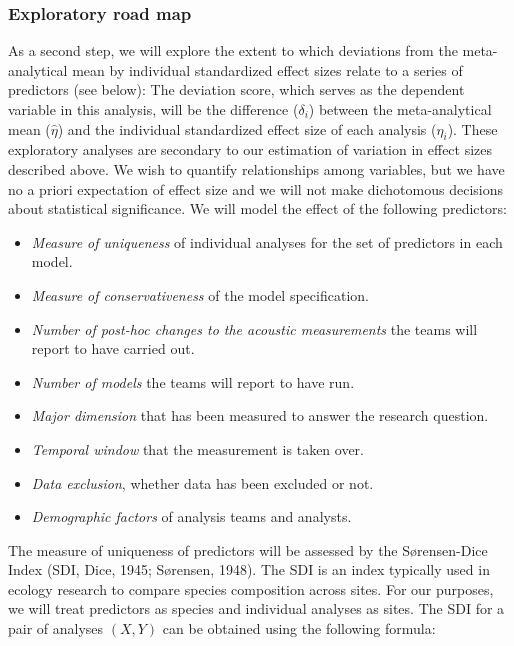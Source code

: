 \documentclass[
  english,
  man]{apa6}
\providecommand{\tightlist}{%
  \setlength{\itemsep}{0pt}\setlength{\parskip}{0pt}}
\begin{document}
\hypertarget{exploratory-road-map}{%
\subsubsection{Exploratory road map}\label{exploratory-road-map}}

As a second step, we will explore the extent to which deviations from the meta-analytical mean by individual standardized effect sizes relate to a series of predictors (see below): The deviation score, which serves as the dependent variable in this analysis, will be the difference (\(\delta_i\)) between the meta-analytical mean (\(\hat{\eta}\)) and the individual standardized effect size of each analysis (\(\eta_i\)).
These exploratory analyses are secondary to our estimation of variation in effect sizes described above.
We wish to quantify relationships among variables, but we have no a priori expectation of effect size and we will not make dichotomous decisions about statistical significance.
We will model the effect of the following predictors:

\begin{itemize}
\tightlist
\item
  \emph{Measure of uniqueness} of individual analyses for the set of predictors in each model.
\item
  \emph{Measure of conservativeness} of the model specification.
\item
  \emph{Number of post-hoc changes to the acoustic measurements} the teams will report to have carried out.
\item
  \emph{Number of models} the teams will report to have run.
\item
  \emph{Major dimension} that has been measured to answer the research question.
\item
  \emph{Temporal window} that the measurement is taken over.
\item
  \emph{Data exclusion}, whether data has been excluded or not.
\item
  \emph{Demographic factors} of analysis teams and analysts.
\end{itemize}

The measure of uniqueness of predictors will be assessed by the Sørensen-Dice Index (SDI, Dice, 1945; Sørensen, 1948).
The SDI is an index typically used in ecology research to compare species composition across sites.
For our purposes, we will treat predictors as species and individual analyses as sites.
The SDI for a pair of analyses \((X, Y)\) can be obtained using the following formula:
\end{document}
